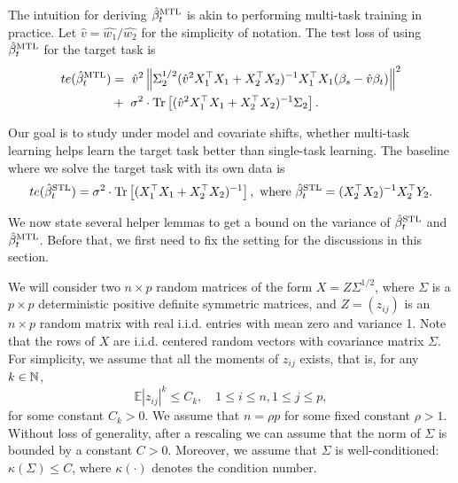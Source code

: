 The intuition for deriving $\hat{\beta}_t^{\text{MTL}}$ is akin to performing multi-task training in practice.
Let $\hat{v} = \hat{w_1} / \hat{w_2}$ for the simplicity of notation.
The test loss of using $\hat{\beta}_t^{\text{MTL}}$ for the target task is
\begin{align}
	te(\hat{\beta}_t^{\text{MTL}}) &=~ \hat{v}^2 \left\| \Sigma_2^{1/2}(\hat{v}^2 X_1^{\top}X_1 + X_2^{\top}X_2)^{-1} X_1^{\top}X_1 (\beta_s - \hat{v} \beta_t) \right\|^2 \nonumber \\
			&+~  \sigma^2 \cdot \operatorname{Tr}\left[(\hat{v}^2 X_1^{\top}X_1 + X_2^{\top}X_2)^{-1} \Sigma_2\right]. \label{eq_te_mtl_2task}
\end{align}

Our goal is to study under model and covariate shifts, whether multi-task learning helps learn the target task better than single-task learning.
The baseline where we solve the target task with its own data is
\begin{align*}
	te(\hat{\beta}_t^{\text{STL}}) = \sigma^2 \cdot \operatorname{Tr}\left[(X_1^{\top}X_1 + X_2^{\top}X_2)^{-1}\right], \text{ where } \hat{\beta}_t^{\text{STL}} = (X_2^{\top}X_2)^{-1} X_2^{\top}Y_2.
\end{align*}

We now state several helper lemmas to get a bound on the variance of $\hat{\beta}_t^{\text{STL}}$ and $\hat{\beta}_t^{\text{MTL}}$. Before that, we first need to fix the setting for the discussions in this section.

\begin{assumption}\label{assm_secA1}
We will consider two $n\times p$ random matrices of the form $X=Z\Sigma^{1/2}$, where $\Sigma$  is a $p\times p$ deterministic positive definite symmetric matrices, and $Z=(z_{ij})$ is an $n\times p$ random matrix with real i.i.d. entries with mean zero and variance 1. Note that the rows of $X$ are i.i.d. centered random vectors with covariance matrix $\Sigma$. For simplicity, we assume that all the moments of $z_{ij}$ exists, that is, for any $k\in \mathbb{N}$,
\begin{equation}\label{assmAhigh}
\mathbb{E} |z_{ij}|^k \le C_k ,\quad 1\le i \le n, 1\le j \le p,
\end{equation}
for some constant $C_k>0$. We assume that $n=\rho p$ for some fixed constant $\rho>1$. Without loss of generality, after a rescaling we can assume that the norm of $\Sigma$ is bounded by a constant $C>0$. Moreover, we assume that $\Sigma$ is well-conditioned: $\kappa(\Sigma)\le C$, where $\kappa(\cdot)$ denotes the condition number. 
\end{assumption}

